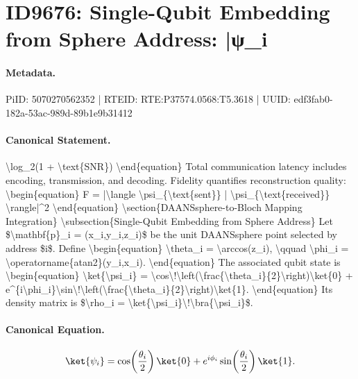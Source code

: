 \section*{ID9676: Single-Qubit Embedding from Sphere Address: |ψ\_i}
\paragraph{Metadata.}
PiID: 5070270562352 | RTEID: RTE:P37574.0568:T5.3618 | UUID: edf3fab0-182a-53ac-989d-89b1e9b31412

\paragraph{Canonical Statement.}
\textbackslash{}log\_2(1 + \textbackslash{}text\{SNR\}) \textbackslash{}end\{equation\} Total communication latency includes encoding, transmission, and decoding. Fidelity quantifies reconstruction quality: \textbackslash{}begin\{equation\} F = |\textbackslash{}langle \textbackslash{}psi\_\{\textbackslash{}text\{sent\}\} | \textbackslash{}psi\_\{\textbackslash{}text\{received\}\} \textbackslash{}rangle|\textasciicircum{}2 \textbackslash{}end\{equation\} \textbackslash{}section\{DAANSsphere-to-Bloch Mapping Integration\} \textbackslash{}subsection\{Single-Qubit Embedding from Sphere Address\} Let \$\textbackslash{}mathbf\{p\}\_i = (x\_i,y\_i,z\_i)\$ be the unit DAANSsphere point selected by address \$i\$. Define \textbackslash{}begin\{equation\} \textbackslash{}theta\_i = \textbackslash{}arccos(z\_i), \textbackslash{}qquad \textbackslash{}phi\_i = \textbackslash{}operatorname\{atan2\}(y\_i,x\_i). \textbackslash{}end\{equation\} The associated qubit state is \textbackslash{}begin\{equation\} \textbackslash{}ket\{\textbackslash{}psi\_i\} = \textbackslash{}cos\textbackslash{}!\textbackslash{}left(\textbackslash{}frac\{\textbackslash{}theta\_i\}\{2\}\textbackslash{}right)\textbackslash{}ket\{0\} + e\textasciicircum{}\{i\textbackslash{}phi\_i\}\textbackslash{}sin\textbackslash{}!\textbackslash{}left(\textbackslash{}frac\{\textbackslash{}theta\_i\}\{2\}\textbackslash{}right)\textbackslash{}ket\{1\}. \textbackslash{}end\{equation\} Its density matrix is \$\textbackslash{}rho\_i = \textbackslash{}ket\{\textbackslash{}psi\_i\}\textbackslash{}!\textbackslash{}bra\{\textbackslash{}psi\_i\}\$.

\paragraph{Canonical Equation.}
\[
\ket{\psi_i} = \cos\!\left(\frac{\theta_i}{2}\right)\ket{0} + e^{i\phi_i}\sin\!\left(\frac{\theta_i}{2}\right)\ket{1}.
\]


